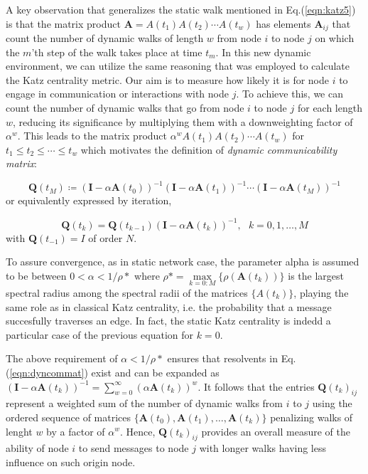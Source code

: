 A key observation that generalizes the static walk mentioned in Eq.(\ref{eqn:katz5}) is that the matrix product $\mathbf{A} = A(t_1)A(t_2)\cdots A(t_w)$ has elements $\mathbf{A}_{ij}$ that count the number of dynamic walks of length $w$ from node $i$ to node $j$ on which the $m$'th step of the walk takes place at time $t_m$. In this new dynamic environment, we can utilize the same reasoning that was employed to calculate the Katz centrality metric. Our aim is to measure how likely it is for node $i$ to engage in communication or interactions with node $j$. To achieve this, we can count the number of dynamic walks that go from node $i$ to node $j$ for each length $w$, reducing its significance by multiplying them with a downweighting factor of $\alpha^w$. This leads to the matrix product $\alpha^wA(t_1)A(t_2)\cdots A(t_w)$ for $t_1\le t_2\le \cdots \le t_w$ which motivates the definition of \textit{dynamic communicability matrix}:

\begin{equation}
\label{eqn:dyncommat}
    \mathbf{Q}(t_M) \coloneqq (\mathbf{I} - \alpha\mathbf{A}(t_0))^{-1} (\mathbf{I} - \alpha\mathbf{A}(t_1))^{-1} \cdots (\mathbf{I} - \alpha\mathbf{A}(t_M))^{-1}
\end{equation}
or equivalently expressed by iteration,

\begin{equation}
\label{eqn:dyncommatiter}
    \mathbf{Q}(t_k) = \mathbf{Q}(t_{k-1})(\mathbf{I} - \alpha\mathbf{A}(t_k))^{-1} , ~~~k=0,1,\dots,M
\end{equation}
with $\mathbf{Q}(t_{-1})=I$ of order $N$.

To assure convergence, as in static network case, the parameter alpha is assumed to be between $0<\alpha<1/\rho*$ where $\rho* = \underset{k=0:M}{\max}\{\rho(\mathbf{A}(t_k))\}$ is the largest spectral radius among the spectral radii of the matrices $\{A(t_k)\}$, playing the same role as in classical Katz centrality, i.e. the probability that a message succesfully traverses an edge. In fact, the static Katz centrality is indedd a particular case of the previous equation for $k=0$.

The above requirement of $\alpha < 1/\rho*$ ensures that resolvents in Eq. (\ref{eqn:dyncommat}) exist and can be expanded as $(\mathbf{I} - \alpha\mathbf{A}(t_k))^{-1} = \sum_{w=0}^{\infty} (\alpha \mathbf{A}(t_k))^w$. It follows that the entries $\mathbf{Q}(t_k)_{ij}$ represent a weighted sum of the number of dynamic walks from $i$ to $j$ using the ordered sequence of matrices $\{\mathbf{A}(t_0),\mathbf{A}(t_1),\dots,\mathbf{A}(t_k)\}$ penalizing walks of lenght $w$ by a factor of $\alpha^w$. Hence, $\mathbf{Q}(t_k)_{ij}$ provides an overall measure of the ability of node $i$ to send messages to node $j$ with longer walks having less influence on such origin node.

